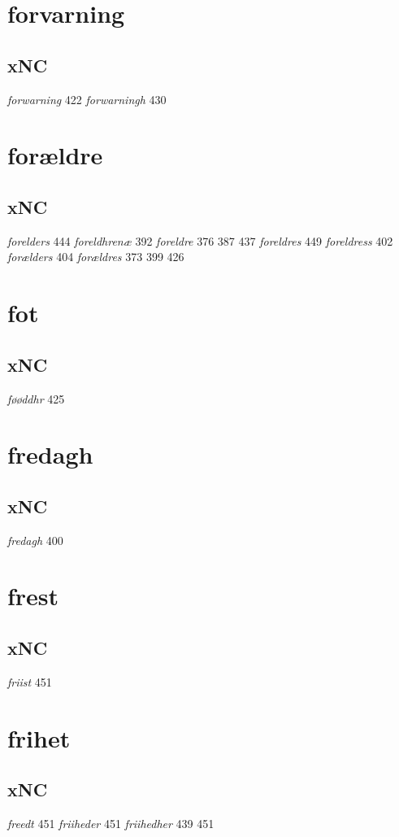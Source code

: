 \documentclass[a4paper,twocolumn]{article}
\begin{document}
\section{forvarning}
\label{sec:orga366347}
\subsection{xNC}
\label{sec:org54f07ad}
\emph{forwarning} 422 \emph{forwarningh} 430 
\section{forældre}
\label{sec:org4d85867}
\subsection{xNC}
\label{sec:org057b975}
\emph{forelders} 444 \emph{foreldhrenæ} 392 \emph{foreldre} 376 387 437 \emph{foreldres} 449 \emph{foreldress} 402 \emph{forælders} 404 \emph{forældres} 373 399 426 
\section{fot}
\label{sec:orgbb7c2f3}
\subsection{xNC}
\label{sec:org5ac8859}
\emph{føøddhr} 425 
\section{fredagh}
\label{sec:orged65cac}
\subsection{xNC}
\label{sec:orgc3faba8}
\emph{fredagh} 400 
\section{frest}
\label{sec:orgd636475}
\subsection{xNC}
\label{sec:org3374c9a}
\emph{friist} 451 
\section{frihet}
\label{sec:orgf80426a}
\subsection{xNC}
\label{sec:org0762541}
\emph{freedt} 451 \emph{friiheder} 451 \emph{friihedher} 439 451 
\end{document}
